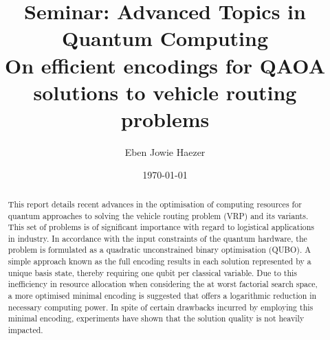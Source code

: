 \documentclass [10pt]{article}
\title {
	Seminar: Advanced Topics in \\
	Quantum Computing \\
	On efficient encodings for QAOA \\
	solutions to vehicle routing problems
}
\author {Eben Jowie Haezer}
\date {\today}
\begin{document}
\maketitle

\begin {abstract}
This report details recent advances in the optimisation of computing resources
for quantum approaches to solving the vehicle routing problem (VRP) and 
its variants. This set of problems is of significant importance with regard
to logistical applications in industry. In accordance with the input
constraints of the quantum hardware, the problem is formulated as a quadratic
unconstrained binary optimisation (QUBO). A simple approach known as the
full encoding results in each solution represented by a unique basis state,
thereby requiring one qubit per classical variable. Due to this inefficiency
in resource allocation when considering the at worst factorial search space,
a more optimised minimal encoding is suggested that offers a logarithmic
reduction in necessary computing power. In spite of certain drawbacks incurred
by employing this minimal encoding, experiments have shown that the solution
quality is not heavily impacted.
\end {abstract}
\end{document}
